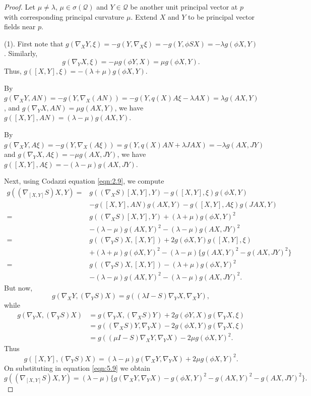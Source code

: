 \documentclass[10pt,a4paper]{amsart}
\begin{document}
\begin{proof}
Let $\mu\neq\lambda$, $\mu\in\sigma(\mathcal{Q})$ and $Y\in \mathcal{Q}$ be another unit
principal vector at $p$ with corresponding principal
curvature $\mu$. Extend $X$ and $Y$ to be principal vector fields near $p$.

(1). First note that $g(\nabla_X Y,\xi)=-g(Y,\nabla_X \xi)=-g(Y,\phi SX)=-\lambda g(\phi X,Y)$. Similarly,
$$
g(\nabla_Y X,\xi)=-\mu g(\phi Y,X)=\mu g(\phi X,Y).
$$
Thus, $g([X,Y],\xi)=-(\lambda+\mu)g(\phi X,Y)$.

By $g(\nabla_X Y,AN)=-g(Y,\nabla_X (AN))=-g(Y,q(X)A\xi-\lambda AX)=\lambda g(A X,Y)$, and
$g(\nabla_Y X,AN)=\mu g(AX,Y)$, we have $g([X,Y],AN)=(\lambda-\mu)g(AX,Y)$.

By $g(\nabla_X Y,A\xi)=-g(Y,\nabla_X (A\xi))=g(Y,q(X)AN+\lambda JAX)=-\lambda g(AX,JY)$ and
$g(\nabla_Y X,A\xi)=-\mu g(AX,JY)$, we have $g([X,Y],A\xi)=-(\lambda-\mu)g(AX,JY)$.

Next, using Codazzi equation \eqref{eqn:2.9}, we compute
\begin{equation}\label{eqn:5.9}
\begin{aligned}
g((\nabla_{[X,Y]}S)X,Y)=&g((\nabla_X S)[X,Y],Y)-g([X,Y],\xi)g(\phi X,Y)\\
&-g([X,Y],AN)g(AX,Y)-g([X,Y],A\xi)g(JAX,Y)\\
=&g((\nabla_X S)[X,Y],Y)+(\lambda+\mu)g(\phi X,Y)^2\\
&-(\lambda-\mu)g(AX,Y)^2-(\lambda-\mu)g(AX,JY)^2\\
=&g((\nabla_Y S)X,[X,Y])+2g(\phi X,Y)g([X,Y],\xi)\\
&+(\lambda+\mu)g(\phi X,Y)^2-(\lambda-\mu)\{g(AX,Y)^2-g(AX,JY)^2\}\\
=&g((\nabla_Y S)X,[X,Y])-(\lambda+\mu)g(\phi X,Y)^2\\
&-(\lambda-\mu)g(AX,Y)^2-(\lambda-\mu)g(AX,JY)^2.
\end{aligned}
\end{equation}
But now,
$$
g(\nabla_X Y,(\nabla_Y S)X)=g((\lambda I-S)\nabla_Y X,\nabla_X Y),
$$
while
$$
\begin{aligned}
g(\nabla_Y X,(\nabla_Y S)X)&=g(\nabla_Y X,(\nabla_X S)Y)+2g(\phi Y,X)g(\nabla_Y X,\xi)\\
&=g((\nabla_X S)Y,\nabla_Y X)-2g(\phi X,Y)g(\nabla_Y X,\xi)\\
&=g((\mu I-S)\nabla_X Y,\nabla_Y X)-2\mu g(\phi X,Y)^2.
\end{aligned}
$$
Thus
\begin{equation}\label{eqn:5.10}
g([X,Y],(\nabla_Y S)X)=(\lambda-\mu)g(\nabla_X Y,\nabla_Y X)+2\mu g(\phi X,Y)^2.
\end{equation}
On substituting in equation \eqref{eqn:5.9} we obtain
%
\begin{equation}\label{eqn:5.1}
g((\nabla_{[X,Y]} S)X,Y)=(\lambda-\mu)\Big\{g(\nabla_X Y,\nabla_Y X)
-g(\phi X,Y)^2-g(AX,Y)^2-g(AX,JY)^2\Big\}.
\end{equation}


\end{proof}
\end{document}
